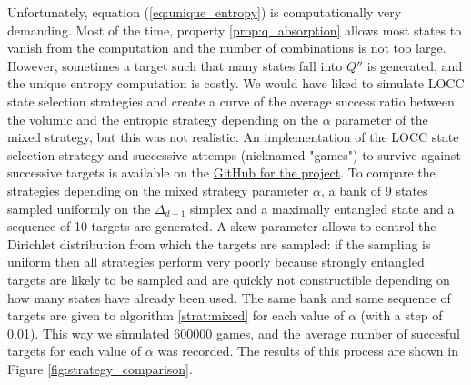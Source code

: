 Unfortunately, equation (\ref{eq:unique_entropy}) is computationally very demanding. Most of the time, property \ref{prop:q_absorption} allows most states to vanish from the computation and the number of combinations is not too large. However, sometimes a target such that many states fall into $Q''$ is generated, and the unique entropy computation is costly. We would have liked to simulate LOCC state selection strategies and create a curve of the average success ratio between the volumic and the entropic strategy depending on the $\alpha$ parameter of the mixed strategy, but this was not realistic. An implementation of the LOCC state selection strategy and successive attemps (nicknamed "games") to survive against successive targets is available on the \href{https://github.com/traaldbjerg/MajoLat}{GitHub for the project}. To compare the strategies depending on the mixed strategy parameter $\alpha$, a bank of 9 states sampled uniformly on the $\Delta_{d-1}$ simplex and a maximally entangled state and a sequence of 10 targets are generated. A skew parameter allows to control the Dirichlet distribution from which the targets are sampled: if the sampling is uniform then all strategies perform very poorly because strongly entangled targets are likely to be sampled and are quickly not constructible depending on how many states have already been used. The same bank and same sequence of targets are given to algorithm \ref{strat:mixed} for each value of $\alpha$ (with a step of 0.01). This way we simulated 600000 games, and the average number of succesful targets for each value of $\alpha$ was recorded. The results of this process are shown in Figure \ref{fig:strategy_comparison}.

